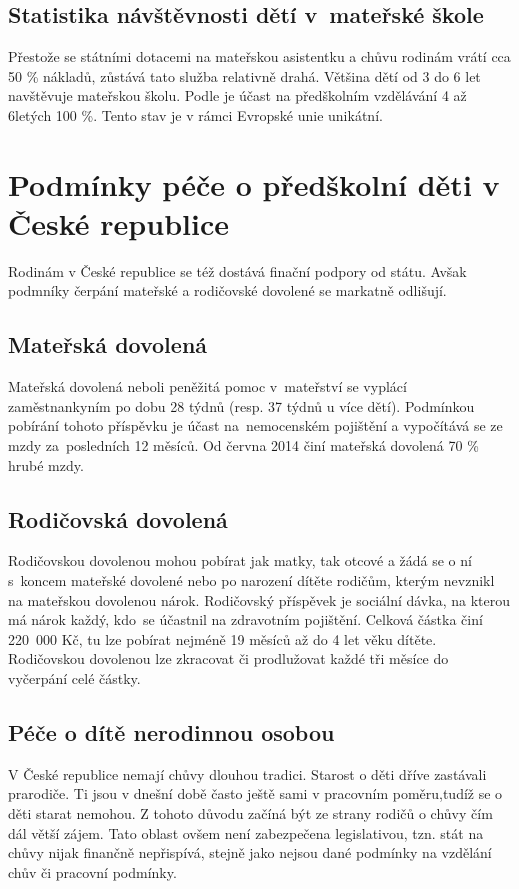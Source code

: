 			\subsection{Statistika návštěvnosti dětí v mateřské škole}
			\label{statistika}
				Přestože se státními dotacemi na mateřskou asistentku a chůvu rodinám vrátí cca 50 \% nákladů, zůstává tato služba relativně drahá. Většina dětí od 3 do 6 let navštěvuje mateřskou školu. Podle \cite{Eurydice} je účast na předškolním vzdělávání 4 až 6letých 100 \%. Tento stav je v rámci Evropské unie unikátní. 
			

		\section{Podmínky péče o předškolní děti v České republice}
		Rodinám v České republice se též dostává finační podpory od státu. Avšak podmníky čerpání mateřské a rodičovské dovolené se markatně odlišují.

			\subsection{Mateřská dovolená}
				Mateřská dovolená neboli peněžitá pomoc v mateřství se vyplácí zaměstnankyním po dobu 28 týdnů (resp. 37 týdnů u více dětí). Podmínkou pobírání tohoto příspěvku je účast na nemocenském pojištění a vypočítává se ze mzdy za posledních 12 měsíců. Od června 2014 činí mateřská dovolená 70 \% hrubé mzdy. \citep{materska}

			\subsection{Rodičovská dovolená}
				Rodičovskou dovolenou mohou pobírat jak matky, tak otcové a žádá se o ní s koncem mateřské dovolené nebo po narození dítěte rodičům, kterým nevznikl na mateřskou dovolenou nárok. Rodičovský příspěvek je sociální dávka, na kterou má nárok každý, kdo se účastnil na zdravotním pojištění. Celková částka činí 220 000 Kč, tu lze pobírat nejméně 19 měsíců až do 4 let věku dítěte. Rodičovskou dovolenou lze zkracovat či prodlužovat každé tři měsíce do vyčerpání celé částky. \citep{rodicovska}

			\subsection{Péče o dítě nerodinnou osobou}
				V České republice nemají chůvy dlouhou tradici. Starost o děti dříve zastávali prarodiče. Ti jsou v dnešní době často ještě sami v pracovním poměru,tudíž se o děti starat nemohou. Z tohoto důvodu začíná být ze strany rodičů o chůvy čím dál větší zájem. Tato oblast ovšem není zabezpečena legislativou, tzn. stát na chůvy nijak finančně nepřispívá, stejně jako nejsou dané podmínky na vzdělání chův či pracovní podmínky. 


